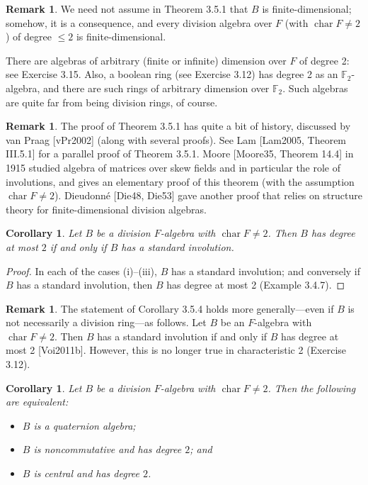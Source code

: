 \documentclass{article}
\newtheorem{corollary}[theorem]{Corollary}
\theoremstyle{definition}
\newtheorem{remark}[theorem]{Remark}
\begin{document}
\begin{remark}
We need not assume in Theorem 3.5.1 that $B$ is finite-dimensional; somehow, it is a consequence, and every division algebra over $F$ (with $\operatorname{char} F \neq 2$) of degree $\leq 2$ is finite-dimensional.

There are algebras of arbitrary (finite or infinite) dimension over $F$ of degree 2: see Exercise 3.15. Also, a boolean ring (see Exercise 3.12) has degree 2 as an $\mathbb{F}_2$-algebra, and there are such rings of arbitrary dimension over $\mathbb{F}_2$. Such algebras are quite far from being division rings, of course.
\end{remark}

\begin{remark}
The proof of Theorem 3.5.1 has quite a bit of history, discussed by van Praag [vPr2002] (along with several proofs). See Lam [Lam2005, Theorem III.5.1] for a parallel proof of Theorem 3.5.1. Moore [Moore35, Theorem 14.4] in 1915 studied algebra of matrices over skew fields and in particular the role of involutions, and gives an elementary proof of this theorem (with the assumption $\operatorname{char} F \neq 2$). Dieudonn\'{e} [Die48, Die53] gave another proof that relies on structure theory for finite-dimensional division algebras.
\end{remark}

\begin{corollary}
Let $B$ be a division $F$-algebra with $\operatorname{char} F \neq 2$. Then $B$ has degree at most $2$ if and only if $B$ has a standard involution.
\end{corollary}

\begin{proof}
In each of the cases (i)--(iii), $B$ has a standard involution; and conversely if $B$ has a standard involution, then $B$ has degree at most 2 (Example 3.4.7).
\end{proof}

\begin{remark}
The statement of Corollary 3.5.4 holds more generally---even if $B$ is not necessarily a division ring---as follows. Let $B$ be an $F$-algebra with $\operatorname{char} F \neq 2$. Then $B$ has a standard involution if and only if $B$ has degree at most 2 [Voi2011b]. However, this is no longer true in characteristic 2 (Exercise 3.12).
\end{remark}

\begin{corollary}
Let $B$ be a division $F$-algebra with $\operatorname{char} F \neq 2$. Then the following are equivalent:
\begin{itemize}
  \item[(i)] $B$ is a quaternion algebra;
  \item[(ii)] $B$ is noncommutative and has degree $2$; and
  \item[(iii)] $B$ is central and has degree $2$.
\end{itemize}
\end{corollary}
\end{document}
